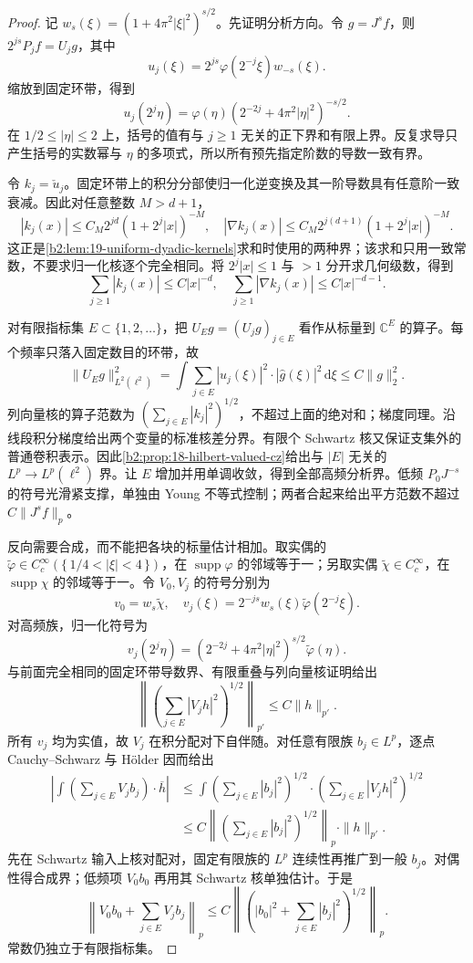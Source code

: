 \begin{proof}
记 \(w_s(\xi)=(1+4\pi^2|\xi|^2)^{s/2}\)。先证明分析方向。令 \(g=J^sf\)，则
\(2^{js}P_jf=U_jg\)，其中
\[
 u_j(\xi)=2^{js}\varphi(2^{-j}\xi)w_{-s}(\xi).
\]
缩放到固定环带，得到
\[
 u_j(2^j\eta)=
 \varphi(\eta)(2^{-2j}+4\pi^2|\eta|^2)^{-s/2}.
\]
在 \(1/2\leq|\eta|\leq2\) 上，括号的值有与 \(j\geq1\) 无关的正下界和有限上界。反复求导只产生括号的实数幂与 \(\eta\) 的多项式，所以所有预先指定阶数的导数一致有界。

令 \(k_j=\check u_j\)。固定环带上的积分分部使归一化逆变换及其一阶导数具有任意阶一致衰减。因此对任意整数 \(M>d+1\)，
\[
 |k_j(x)|\leq C_M2^{jd}(1+2^j|x|)^{-M},\quad
 |\nabla k_j(x)|\leq C_M2^{j(d+1)}(1+2^j|x|)^{-M}.
\]
这正是\cref{b2:lem:19-uniform-dyadic-kernels}求和时使用的两种界；该求和只用一致常数，不要求归一化核逐个完全相同。将 \(2^j|x|\leq1\) 与 \(>1\) 分开求几何级数，得到
\[
 \sum_{j\geq1}|k_j(x)|\leq C|x|^{-d},\quad
 \sum_{j\geq1}|\nabla k_j(x)|\leq C|x|^{-d-1}.
\]

对有限指标集 \(E\subset\{1,2,\ldots\}\)，把 \(U_Eg=(U_jg)_{j\in E}\) 看作从标量到 \(\mathbb C^E\) 的算子。每个频率只落入固定数目的环带，故
\[
 \|U_Eg\|_{L^2(\ell^2)}^2
 =\int\sum_{j\in E}|u_j(\xi)|^2\cdot|\widehat g(\xi)|^2\,\mathrm d\xi
 \leq C\|g\|_2^2.
\]
列向量核的算子范数为 \((\sum_{j\in E}|k_j|^2)^{1/2}\)，不超过上面的绝对和；梯度同理。沿线段积分梯度给出两个变量的标准核差分界。有限个 Schwartz 核又保证支集外的普通卷积表示。因此\cref{b2:prop:18-hilbert-valued-cz}给出与 \(|E|\) 无关的 \(L^p\to L^p(\ell^2)\) 界。让 \(E\) 增加并用单调收敛，得到全部高频分析界。低频 \(P_0J^{-s}\) 的符号光滑紧支撑，单独由 Young 不等式控制；两者合起来给出平方范数不超过 \(C\|J^sf\|_p\)。

反向需要合成，而不能把各块的标量估计相加。取实偶的
\(\widetilde\varphi\in C_c^\infty(\{\,1/4<|\xi|<4\,\})\)，在
\(\operatorname{supp}\varphi\) 的邻域等于一；另取实偶
\(\widetilde\chi\in C_c^\infty\)，在 \(\operatorname{supp}\chi\) 的邻域等于一。令 \(V_0,V_j\) 的符号分别为
\[
 v_0=w_s\widetilde\chi,\quad
 v_j(\xi)=2^{-js}w_s(\xi)\widetilde\varphi(2^{-j}\xi).
\]
对高频族，归一化符号为
\[
 v_j(2^j\eta)=
 (2^{-2j}+4\pi^2|\eta|^2)^{s/2}\widetilde\varphi(\eta).
\]
与前面完全相同的固定环带导数界、有限重叠与列向量核证明给出
\[
 \left\|\left(\sum_{j\in E}|V_jh|^2\right)^{1/2}\right\|_{p'}
 \leq C\|h\|_{p'}.
\]
所有 \(v_j\) 均为实值，故 \(V_j\) 在积分配对下自伴随。对任意有限族 \(b_j\in L^p\)，逐点 Cauchy--Schwarz 与 Hölder 因而给出
\[
 \begin{aligned}
 \left|\int\left(\sum_{j\in E}V_jb_j\right)\cdot\overline h\right|
 &\leq\int
       \left(\sum_{j\in E}|b_j|^2\right)^{1/2}
       \cdot\left(\sum_{j\in E}|V_jh|^2\right)^{1/2}\\
 &\leq C\left\|\left(\sum_{j\in E}|b_j|^2\right)^{1/2}\right\|_p
          \cdot\|h\|_{p'}.
 \end{aligned}
\]
先在 Schwartz 输入上核对配对，固定有限族的 \(L^p\) 连续性再推广到一般 \(b_j\)。对偶性得合成界；低频项 \(V_0b_0\) 再用其 Schwartz 核单独估计。于是
\[
 \left\|V_0b_0+\sum_{j\in E}V_jb_j\right\|_p
 \leq C\left\|\left(|b_0|^2+\sum_{j\in E}|b_j|^2\right)^{1/2}\right\|_p.
\]
常数仍独立于有限指标集。


\end{proof}
